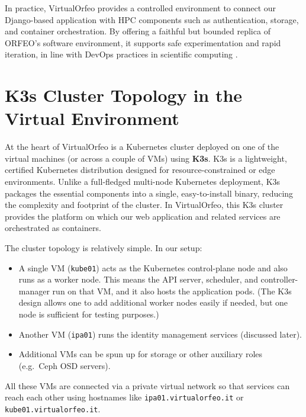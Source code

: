 \medskip

In practice, VirtualOrfeo provides a controlled environment to connect our Django-based application with HPC components such as authentication, storage, and container orchestration. By offering a faithful but bounded replica of ORFEO’s software environment, it supports safe experimentation and rapid iteration, in line with DevOps practices in scientific computing \parencite{Ohmura2023TwdsDT}.


\section{K3s Cluster Topology in the Virtual Environment}

At the heart of VirtualOrfeo is a Kubernetes cluster deployed on one of the
virtual machines (or across a couple of VMs) using \textbf{K3s}. K3s is a
lightweight, certified Kubernetes distribution designed for resource-constrained
or edge environments\parencite{Rancher2021K3s}. Unlike a full-fledged multi-node
Kubernetes deployment, K3s packages the essential components into a single,
easy-to-install binary, reducing the complexity and footprint of the cluster. In
VirtualOrfeo, this K3s cluster provides the platform on which our web application
and related services are orchestrated as containers.

\medskip

The cluster topology is relatively simple. In our setup:
\begin{itemize}
	\item A single VM (\texttt{kube01}) acts as the Kubernetes control-plane node
	and also runs as a worker node. This means the API server, scheduler, and
	controller-manager run on that VM, and it also hosts the application pods.
	(The K3s design allows one to add additional worker nodes easily if needed,
	but one node is sufficient for testing purposes.)
	\item Another VM (\texttt{ipa01}) runs the identity management services
	(discussed later).
	\item Additional VMs can be spun up for storage or other auxiliary roles
	(e.g.\ Ceph OSD servers).
\end{itemize}

All these VMs are connected via a private virtual network so that services can
reach each other using hostnames like \texttt{ipa01.virtualorfeo.it} or
\texttt{kube01.virtualorfeo.it}.

